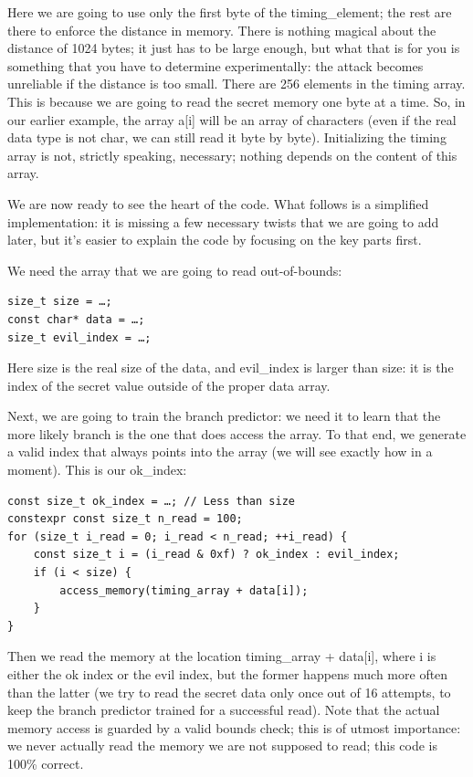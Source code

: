 Here we are going to use only the first byte of the timing\_element; the rest are there to enforce the distance in memory. There is nothing magical about the distance of 1024 bytes; it just has to be large enough, but what that is for you is something that you have to determine experimentally: the attack becomes unreliable if the distance is too small. There are 256 elements in the timing array. This is because we are going to read the secret memory one byte at a time. So, in our earlier example, the array a[i] will be an array of characters (even if the real data type is not char, we can still read it byte by byte). Initializing the timing array is not, strictly speaking, necessary; nothing depends on the content of this array.

We are now ready to see the heart of the code. What follows is a simplified  implementation: it is missing a few necessary twists that we are going to add later, but it's easier to explain the code by focusing on the key parts first.

We need the array that we are going to read out-of-bounds:

\begin{lstlisting}[style=styleCXX]
size_t size = …;
const char* data = …;
size_t evil_index = …;
\end{lstlisting}

Here size is the real size of the data, and evil\_index is larger than size: it is the index of the secret value outside of the proper data array.

Next, we are going to train the branch predictor: we need it to learn that the more likely branch is the one that does access the array. To that end, we generate a valid index that always points into the array (we will see exactly how in a moment). This is our ok\_index:

\begin{lstlisting}[style=styleCXX]
const size_t ok_index = …; // Less than size
constexpr const size_t n_read = 100;
for (size_t i_read = 0; i_read < n_read; ++i_read) {
	const size_t i = (i_read & 0xf) ? ok_index : evil_index;
	if (i < size) {
		access_memory(timing_array + data[i]);
	}
}
\end{lstlisting}

Then we read the memory at the location timing\_array + data[i], where i is either the ok index or the evil index, but the former happens much more often than the latter (we try to read the secret data only once out of 16 attempts, to keep the branch predictor trained for a successful read). Note that the actual memory access is guarded by a valid bounds check; this is of utmost importance: we never actually read the memory we are not supposed to read; this code is 100\% correct.

